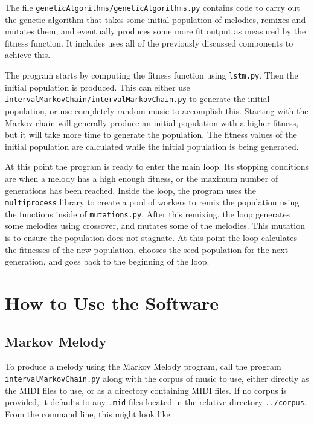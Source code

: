 The file \texttt{geneticAlgorithms/geneticAlgorithms.py} contains code to carry out the genetic algorithm that takes some initial population of melodies, remixes and mutates them, and eventually produces some more fit output as measured by the fitness function.
It includes uses all of the previously discussed components to achieve this.

The program starts by computing the fitness function using \texttt{lstm.py}.
Then the initial population is produced.
This can either use \texttt{intervalMarkovChain/intervalMarkovChain.py} to generate the initial population, or use completely random music to accomplish this.
Starting with the Markov chain will generally produce an initial population with a higher fitness, but it will take more time to generate the population.
The fitness values of the initial population are calculated while the initial population is being generated.

At this point the program is ready to enter the main loop.
Its stopping conditions are when a melody has a high enough fitness, or the maximum number of generations has been reached.
Inside the loop, the program uses the \texttt{multiprocess} library to create a pool of workers to remix the population using the functions inside of \texttt{mutations.py}.
After this remixing, the loop generates some melodies using crossover, and mutates some of the melodies.
This mutation is to ensure the population does not stagnate.
At this point the loop calculates the fitnesses of the new population, chooses the seed population for the next generation, and goes back to the beginning of the loop.



\section{How to Use the Software} \label{software:howtouse}

\subsection{Markov Melody} \label{software:howtouse:markov}

To produce a melody using the Markov Melody program, call the program \texttt{intervalMarkovChain.py} along with the corpus of music to use, either directly as the MIDI files to use, or as a directory containing MIDI files.
If no corpus is provided, it defaults to any \texttt{.mid} files located in the relative directory \texttt{../corpus}.
From the command line, this might look like

